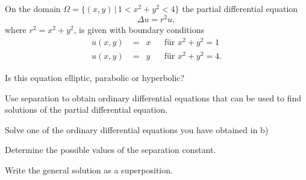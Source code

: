 On the domain $\Omega = \{ (x,y)\,|\, 1 < x^2+y^2 < 4\}$ the partial
differential equation
\begin{equation}
\Delta u = r^2 u,
\label{40000024:pde}
\end{equation}
where $r^2=x^2+y^2$,
is given with boundary conditions
\begin{equation}
\begin{aligned}
u(x,y) &= \phantom{\textstyle\frac12}x  & &\text{für $x^2+y^2 = 1$}\\
u(x,y) &= \phantom{\textstyle\frac12}y  & &\text{für $x^2+y^2 = 4$.}
\end{aligned}
\label{40000024:boundarypolar}
\end{equation}
\begin{teilaufgaben}
\item
Is this equation elliptic, parabolic or hyperbolic?
\item
Use separation to obtain ordinary differential equations that can be
used to find solutions of the partial differential equation.
\item
Solve one of the ordinary differential equations you have obtained
in b)
\item
Determine the possible values of the separation constant.
\item
Write the general solution as a superposition.
\end{teilaufgaben}


